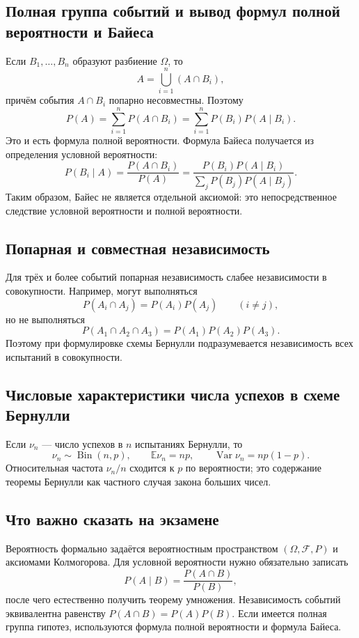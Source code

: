 \subsection{Полная группа событий и вывод формул полной вероятности и Байеса}

Если $B_1,\ldots,B_n$ образуют разбиение $\Omega$, то
\[
    A=\bigcup_{i=1}^n (A\cap B_i),
\]
причём события $A\cap B_i$ попарно несовместны. Поэтому
\[
    P(A)=\sum_{i=1}^n P(A\cap B_i)
        =\sum_{i=1}^n P(B_i)P(A\mid B_i).
\]
Это и есть формула полной вероятности. Формула Байеса получается из определения
условной вероятности:
\[
P(B_i\mid A)=\frac{P(A\cap B_i)}{P(A)}
=\frac{P(B_i)P(A\mid B_i)}{\sum_j P(B_j)P(A\mid B_j)}.
\]
Таким образом, Байес не является отдельной аксиомой: это непосредственное следствие
условной вероятности и полной вероятности.

\subsection{Попарная и совместная независимость}

Для трёх и более событий попарная независимость слабее независимости в совокупности.
Например, могут выполняться
\[
P(A_i\cap A_j)=P(A_i)P(A_j)\qquad (i\ne j),
\]
но не выполняться
\[
P(A_1\cap A_2\cap A_3)=P(A_1)P(A_2)P(A_3).
\]
Поэтому при формулировке схемы Бернулли подразумевается независимость всех испытаний
в совокупности.

\subsection{Числовые характеристики числа успехов в схеме Бернулли}

Если $\nu_n$ --- число успехов в $n$ испытаниях Бернулли, то
\[
    \nu_n\sim\operatorname{Bin}(n,p),\qquad
    \mathbb E\nu_n=np,\qquad
    \operatorname{Var}\nu_n=np(1-p).
\]
Относительная частота $\nu_n/n$ сходится к $p$ по вероятности; это содержание
теоремы Бернулли как частного случая закона больших чисел.

\subsection{Что важно сказать на экзамене}

Вероятность формально задаётся вероятностным пространством
$(\Omega,\mathcal F,P)$ и аксиомами Колмогорова. Для условной вероятности нужно
обязательно записать
\[
    P(A\mid B)=\frac{P(A\cap B)}{P(B)},
\]
после чего естественно получить теорему умножения. Независимость событий
эквивалентна равенству $P(A\cap B)=P(A)P(B)$. Если имеется полная группа гипотез,
используются формула полной вероятности и формула Байеса.

\newpage
